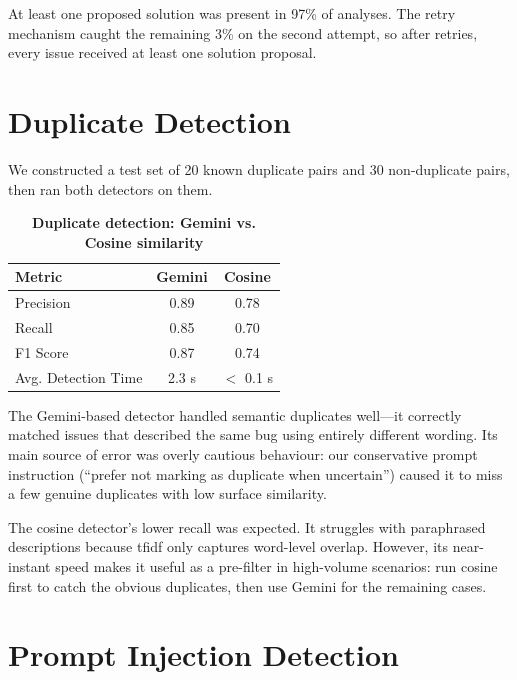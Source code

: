 At least one proposed solution was present in 97\% of analyses. The retry mechanism caught the remaining 3\% on the second attempt, so after retries, every issue received at least one solution proposal.

\section{Duplicate Detection}

We constructed a test set of 20 known duplicate pairs and 30 non-duplicate pairs, then ran both detectors on them.

\begin{table}[htb]
\centering
\renewcommand{\arraystretch}{1.3}
\setlength{\arrayrulewidth}{0.5mm}
\fontsize{10}{12}\selectfont
\caption[Duplicate detection: Gemini vs. Cosine similarity]{\textbf{Duplicate detection: Gemini vs. Cosine similarity}}
\vspace{2mm}
\label{tab:dupcomp}
\begin{tabular}{|p{4cm}|c|c|}
\hline
\textbf{Metric} & \textbf{Gemini} & \textbf{Cosine} \\
\hline
Precision & 0.89 & 0.78 \\
\hline
Recall & 0.85 & 0.70 \\
\hline
F1 Score & 0.87 & 0.74 \\
\hline
Avg. Detection Time & 2.3 s & $<$ 0.1 s \\
\hline
\end{tabular}
\end{table}

The Gemini-based detector handled semantic duplicates well---it correctly matched issues that described the same bug using entirely different wording. Its main source of error was overly cautious behaviour: our conservative prompt instruction (``prefer not marking as duplicate when uncertain'') caused it to miss a few genuine duplicates with low surface similarity.

The cosine detector's lower recall was expected. It struggles with paraphrased descriptions because \gls{tfidf} only captures word-level overlap. However, its near-instant speed makes it useful as a pre-filter in high-volume scenarios: run cosine first to catch the obvious duplicates, then use Gemini for the remaining cases.

\section{Prompt Injection Detection}


